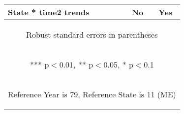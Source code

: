 \begin{center}
\begin{tabular}{lcc}
 State * time2 trends & No & Yes \\ \hline
\multicolumn{3}{c}{\begin{footnotesize} Robust standard errors in parentheses\end{footnotesize}} \\
\multicolumn{3}{c}{\begin{footnotesize} *** p$<$0.01, ** p$<$0.05, * p$<$0.1\end{footnotesize}} \\
\multicolumn{3}{c}{\begin{footnotesize} Reference Year is 79, Reference State is 11 (ME)\end{footnotesize}} \\
\end{tabular}
\end{center}
